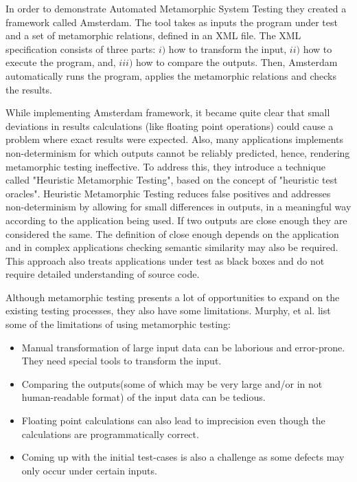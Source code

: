 In order to demonstrate Automated Metamorphic System Testing they created a framework called Amsterdam. The tool takes as inputs the program under test and a set of metamorphic relations, defined in an XML file. The XML specification consists of three parts: $i)$ how to transform the input, $ii)$ how to execute the program, and, $iii)$ how to compare the outputs. Then, Amsterdam automatically runs the program, applies the metamorphic relations and checks the results. 

While implementing Amsterdam framework, it became quite clear that small deviations in results calculations (like floating point operations) could cause a problem where exact results were expected. Also, many applications implements non-determinism for which outputs cannot be reliably predicted, hence, rendering metamorphic testing ineffective. To address this, they introduce a technique called "Heuristic Metamorphic Testing", based on the concept of "heuristic test oracles". Heuristic Metamorphic Testing reduces false positives and addresses non-determinism by allowing for small differences in outputs, in a meaningful way according to the application being used. If two outputs are close enough they are considered the same. The definition of close enough depends on the application and in complex applications checking semantic similarity may also be required. This approach also treats applications under test as black boxes and do not require detailed understanding of source code.
		
Although metamorphic testing presents a lot of opportunities to expand on the existing testing processes, they also have some limitations. Murphy, et al. \cite{Murphy2009} list some of the limitations of using metamorphic testing:
\begin{itemize}
	\item Manual transformation of large input data can be laborious and error-prone. They need special tools to transform the input.
	\item Comparing the outputs(some of which may be very large and/or in not human-readable format) of the input data can be tedious.
	\item Floating point calculations can also lead to imprecision even though the calculations are programmatically correct.
	\item Coming up with the initial test-cases is also a challenge as some defects may only occur under certain inputs.
\end{itemize}

